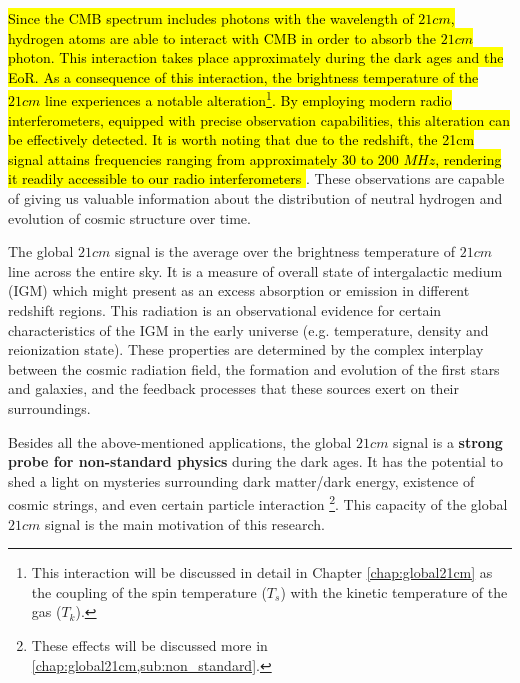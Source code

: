 \documentclass[12pt, TexShade, letterpaper]{report}
\begin{document}
\hl{Since the CMB spectrum includes photons with the wavelength of $21cm$, hydrogen atoms are able to interact with CMB in order to absorb the $21cm$ photon. This interaction takes place approximately during the dark ages and the EoR. As a consequence of this interaction, the brightness temperature of the $21cm$ line experiences a notable alteration\footnote{This interaction will be discussed in detail in Chapter \ref{chap:global21cm} as the coupling of the spin temperature ($T_s$) with the kinetic temperature of the gas ($T_k$).}. By employing modern radio interferometers, equipped with precise observation capabilities, this alteration can be effectively detected. It is worth noting that due to the redshift, the 21cm signal attains frequencies ranging from approximately 30 to 200 $MHz$, rendering it readily accessible to our radio interferometers \cite{low_frequency}}.
These observations are capable of giving us valuable information about the distribution of neutral hydrogen and evolution of cosmic structure over time\cite{low_frequency}.\par
The global $21cm$ signal is the average over the brightness temperature of $21cm$ line across the entire sky. It is a measure of overall state of intergalactic medium (IGM) which might present as an excess absorption or emission in different redshift regions. This radiation is an observational evidence for certain characteristics of the IGM in the early universe (e.g. temperature, density and reionization state). These properties are determined by the complex interplay between the cosmic radiation field, the formation and evolution of the first stars and galaxies, and the feedback processes that these sources exert on their surroundings\cite{21century}.\par
Besides all the above-mentioned applications, the global $21cm$ signal is a \textbf{strong probe for non-standard physics} during the dark ages. It has the potential to shed a light on mysteries surrounding dark matter/dark energy, existence of cosmic strings, and even certain particle interaction  \cite{dark_nature_21, constrain_dm_21, cosmic_string_brandenberger, ee_interaction_21, neutrino_21} \footnote{These effects will be discussed more in \ref{chap:global21cm,sub:non_standard}.}. This capacity of the global $21cm$ signal is the main motivation of this research.\par
\end{document}
